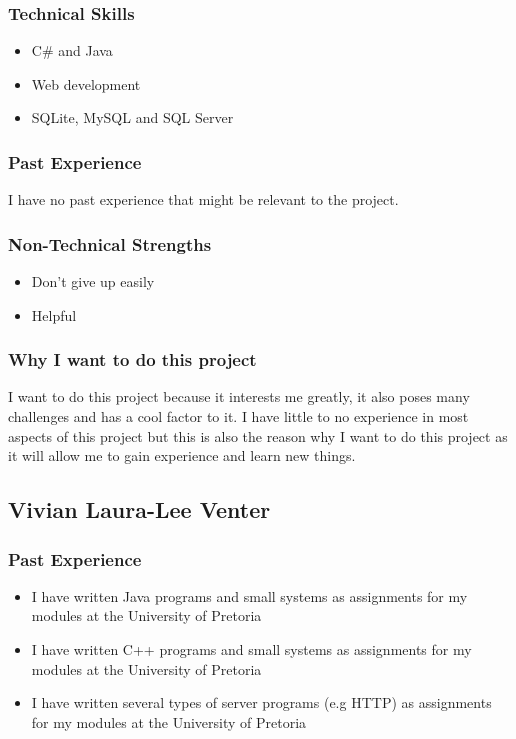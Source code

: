 \subsubsection{Technical Skills} 
	\begin{itemize}
		\item C\# and Java
		\item Web development
		\item SQLite, MySQL and SQL Server
	\end{itemize}
\subsubsection{Past Experience}
I have no past experience that might be relevant to the project. %
\subsubsection{Non-Technical Strengths}
	\begin{itemize}
		\item Don't give up easily
		\item Helpful
	\end{itemize}
\subsubsection{Why I want to do this project} 
I want to do this project because it interests me greatly, it also poses many challenges and has a cool factor to it. I have little to no experience in most aspects of this project but this is also the reason why I want to do this project as it will allow me to gain experience and learn new things. 

\pagebreak
\subsection{Vivian Laura-Lee Venter}

\subsubsection{Past Experience} 
\begin{itemize}
	\item{I have written Java programs and small systems as assignments for my modules at the University of Pretoria}
	\item{I have written C++ programs and small systems as assignments for my modules at the University of Pretoria}
	\item{I have written several types of server programs (e.g HTTP) as assignments for my modules at the University of Pretoria}
\end{itemize}
